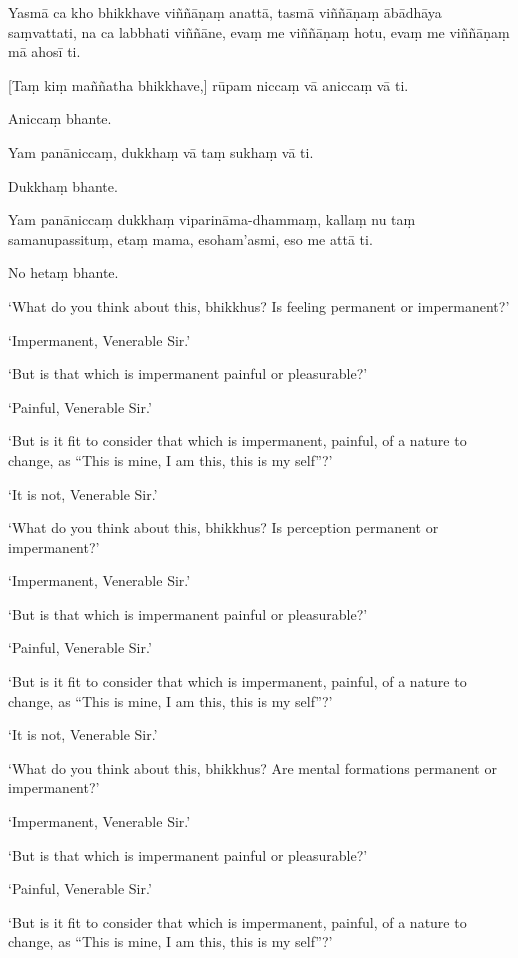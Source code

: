 Yasmā ca kho bhikkhave viññāṇaṃ anattā, tasmā viññāṇaṃ ābādhāya
saṃvattati, na ca labbhati viññāne, evaṃ me viññāṇaṃ hotu, evaṃ me
viññāṇaṃ mā ahosī ti.

[Taṃ kiṃ maññatha bhikkhave,] rūpam niccaṃ vā aniccaṃ vā ti.

Aniccaṃ bhante.

Yam panāniccaṃ, dukkhaṃ vā taṃ sukhaṃ vā ti.

Dukkhaṃ bhante.

Yam panāniccaṃ dukkhaṃ viparināma-dhammaṃ, kallaṃ nu taṃ samanupassituṃ,
etaṃ mama, esoham'asmi, eso me attā ti.

No hetaṃ bhante.

\clearpage

\englishText
\markboth{\englishTitle}{\rightmark}

‘What do you think about this, bhikkhus? Is feeling permanent or
impermanent?’

‘Impermanent, Venerable Sir.’

‘But is that which is impermanent painful or pleasurable?’

‘Painful, Venerable Sir.’

‘But is it fit to consider that which is impermanent, painful, of a
nature to change, as “This is mine, I am this, this is my self”?’

‘It is not, Venerable Sir.’

‘What do you think about this, bhikkhus? Is perception permanent or
impermanent?’

‘Impermanent, Venerable Sir.’

‘But is that which is impermanent painful or pleasurable?’

‘Painful, Venerable Sir.’

‘But is it fit to consider that which is impermanent, painful, of a
nature to change, as “This is mine, I am this, this is my self”?’

‘It is not, Venerable Sir.’

‘What do you think about this, bhikkhus? Are mental formations
permanent or impermanent?’

‘Impermanent, Venerable Sir.’

‘But is that which is impermanent painful or pleasurable?’

‘Painful, Venerable Sir.’

‘But is it fit to consider that which is impermanent, painful, of a
nature to change, as “This is mine, I am this, this is my self”?’

